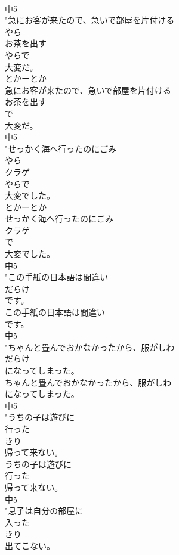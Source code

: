 \documentclass[8pt]{extreport}
\begin{document}
\begin{CJK}{UTF8}{min}
\\	中5
\\	"急にお客が来たので、急いで部屋を片付ける
\\	やら
\\	お茶を出す
\\	やらで
\\	大変だ。
\\	とかーとか 
\\	急にお客が来たので、急いで部屋を片付ける
\\	お茶を出す
\\	で
\\	大変だ。
\\	中5
\\	"せっかく海へ行ったのにごみ
\\	やら
\\	クラゲ
\\	やらで
\\	大変でした。
\\	とかーとか 
\\	せっかく海へ行ったのにごみ
\\	クラゲ
\\	で
\\	大変でした。
\\	中5
\\	"この手紙の日本語は間違い
\\	だらけ
\\	です。
\\	この手紙の日本語は間違い
\\	です。
\\	中5
\\	"ちゃんと畳んでおかなかったから、服がしわ
\\	だらけ
\\	になってしまった。
\\	ちゃんと畳んでおかなかったから、服がしわ
\\	になってしまった。
\\	中5
\\	"うちの子は遊びに
\\	行った
\\	きり
\\	帰って来ない。
\\	うちの子は遊びに
\\	行った
\\	帰って来ない。
\\	中5
\\	"息子は自分の部屋に
\\	入った
\\	きり
\\	出てこない。

\end{CJK}
\end{document}
